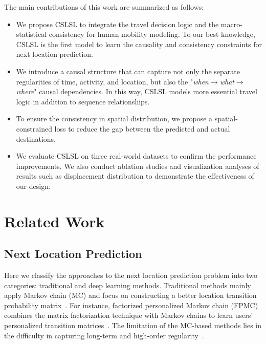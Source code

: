 \documentclass[sigconf]{acmart}
\begin{document}
    The main contributions of this work are summarized as follows:
    \begin{itemize}[leftmargin=*]
    \item We propose CSLSL to integrate the travel decision logic and the macro-statistical consistency for human mobility modeling. To our best knowledge, CSLSL is the first model to learn the causality and consistency constraints for next location prediction. 
    \item We introduce a causal structure that can capture not only the separate regularities of time, activity, and location, but also the "\textit{when$\rightarrow$what$\rightarrow$where}" causal dependencies. In this way, CSLSL models more essential travel logic in addition to sequence relationships.
    \item To ensure the consistency in spatial distribution, we propose a spatial-constrained loss to reduce the gap between the predicted and actual destinations.
    \item We evaluate CSLSL on three real-world datasets to confirm the performance improvements. We also conduct ablation studies and visualization analyses of results such as displacement distribution to demonstrate the effectiveness of our design. 
    \end{itemize}
    
    
\section{Related Work}
\label{sec:related}
    
\subsection{Next Location Prediction}
    Here we classify the approaches to the next location prediction problem into two categories: traditional and deep learning methods.
    Traditional methods mainly apply Markov chain (MC) and focus on constructing a better location transition probability matrix~\cite{rendle2010factorizing,cheng2013you,feng2015personalized,zhao2016stellar}. 
    For instance, factorized personalized Markov chain (FPMC) combines the matrix factorization technique with Markov chains to learn users' personalized transition matrices~\cite{rendle2010factorizing}. The limitation of the MC-based methods lies in the difficulty in capturing long-term and high-order regularity~\cite{guo2020attentional,luo2021stan}.
    
\end{document}
